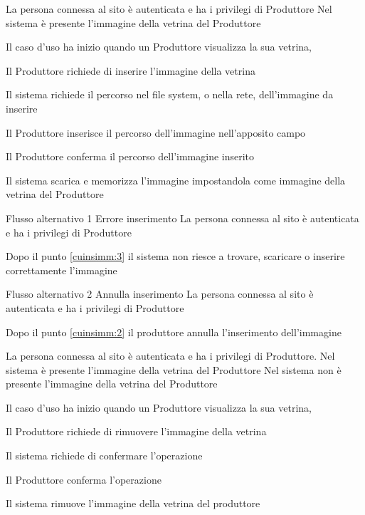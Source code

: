 {}
{La persona connessa al sito è autenticata e ha i privilegi di Produttore}
{Nel sistema è presente l'immagine della vetrina del Produttore}
{\begin{enumCU}
		\item Il caso d'uso ha inizio quando un Produttore visualizza la sua vetrina, 
		\item Il Produttore richiede di inserire l'immagine della vetrina
		\item Il sistema richiede il percorso nel file system, o nella rete, dell'immagine da inserire 
		\item Il Produttore inserisce il percorso dell'immagine nell'apposito campo\label{cuinsimm:2}
		\item Il Produttore conferma il percorso dell'immagine inserito\label{cuinsimm:3}
		\item Il sistema scarica e memorizza l'immagine impostandola come immagine della vetrina del Produttore
	\end{enumCU}}
%
{Flusso alternativo 1}%
{Errore inserimento}%
{La persona connessa al sito è autenticata e ha i privilegi di Produttore}%
{\postNulle}%
{\begin{enumCU}
		\item Dopo il punto \ref{cuinsimm:3} il sistema non riesce a trovare, scaricare o inserire correttamente l'immagine
	\end{enumCU}}%
%
{Flusso alternativo 2}%
{Annulla inserimento}%
{La persona connessa al sito è autenticata e ha i privilegi di Produttore}%
{\postNulle}%
{\begin{enumCU}
		\item Dopo il punto \ref{cuinsimm:2} il produttore annulla l'inserimento dell'immagine
	\end{enumCU}}%


{}
{La persona connessa al sito è autenticata e ha i privilegi di Produttore. Nel sistema è presente l'immagine della vetrina del Produttore}
{Nel sistema non è presente l'immagine della vetrina del Produttore}
{\begin{enumCU}
		\item Il caso d'uso ha inizio quando un Produttore visualizza la sua vetrina, 
		\item Il  Produttore richiede di rimuovere l'immagine della vetrina
		\item Il sistema richiede di confermare l'operazione \label{cudelimm:2}
		\item Il Produttore conferma l'operazione
		\item Il sistema rimuove l'immagine della vetrina del produttore
	\end{enumCU}}

